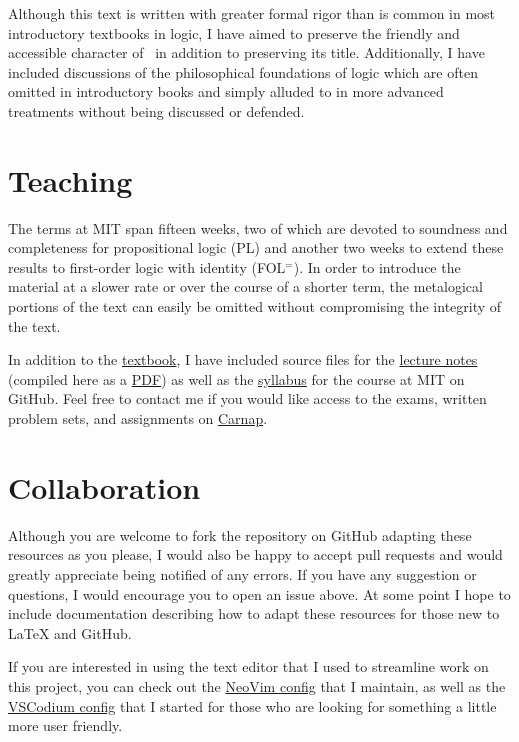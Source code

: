Although this text is written with greater formal rigor than is common in most introductory textbooks in logic, I have aimed to preserve the friendly and accessible character of \forallx\ in addition to preserving its title.
Additionally, I have included discussions of the philosophical foundations of logic which are often omitted in introductory books and simply alluded to in more advanced treatments without being discussed or defended.

\section*{Teaching}

The terms at MIT span fifteen weeks, two of which are devoted to soundness and completeness for propositional logic (PL) and another two weeks to extend these results to first-order logic with identity (FOL$^=$).
In order to introduce the material at a slower rate or over the course of a shorter term, the metalogical portions of the text can easily be omitted without compromising the integrity of the text.

In addition to the \href{https://github.com/benbrastmckie/ForAllX/tree/master/Book/Chapters}{textbook}, I have included source files for the \href{https://github.com/benbrastmckie/ForAllX/tree/master/Lectures}{lecture notes} (compiled here as a \href{https://github.com/benbrastmckie/ForAllX/blob/master/Handouts/All_Handouts.pdf}{PDF}) as well as the \href{https://github.com/benbrastmckie/ForAllX/blob/master/Syllabus/Syllabus.pdf}{syllabus} for the course at MIT on GitHub.
Feel free to contact me if you would like access to the exams, written problem sets, and assignments on \href{https://carnap.io/}{Carnap}.

\section*{Collaboration}

Although you are welcome to fork the repository on GitHub adapting these resources as you please, I would also be happy to accept pull requests and would greatly appreciate being notified of any errors.
If you have any suggestion or questions, I would encourage you to open an issue above.
At some point I hope to include documentation describing how to adapt these resources for those new to \LaTeX{} and GitHub.

If you are interested in using the text editor that I used to streamline work on this project, you can check out the \href{https://github.com/benbrastmckie/.config}{NeoVim config} that I maintain, as well as the \href{https://github.com/benbrastmckie/VSCodium}{VSCodium config} that I started for those who are looking for something a little more user friendly.

